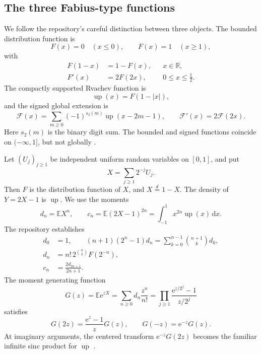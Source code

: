 \documentclass[11pt,oneside]{article}
\theoremstyle{definition}
\theoremstyle{remark}
\newcommand{\Fs}{\mathcal F}
\newcommand{\Up}{\operatorname{up}}
\newcommand{\E}{\mathbb E}
\newcommand{\R}{\mathbb R}
\newcommand{\dd}{\,\mathrm d}
\newcommand{\e}{\mathrm e}
\newcommand{\1}{\mathbf 1}
\begin{document}
\subsection{The three Fabius-type functions}
We follow the repository's careful distinction between three objects.  The
bounded distribution function is
\[
 F(x)=0\quad(x\leq0),\qquad F(x)=1\quad(x\geq1),
\]
with
\begin{align}
 F(1-x)&=1-F(x), &&x\in\R,                                      \label{p1:eq:F-reflect}\\
 F'(x)&=2F(2x), &&0\leq x\leq\tfrac12.                           \label{p1:eq:F-left-diff}
\end{align}
The compactly supported Rvachev function is
\begin{equation}
 \Up(x)=F(1-|x|),                                                \label{p1:eq:up-def}
\end{equation}
and the signed global extension is
\begin{equation}
 \Fs(x)=\sum_{m\geq0}(-1)^{s_2(m)}\Up(x-2m-1),
 \qquad \Fs'(x)=2\Fs(2x).                                      \label{p1:eq:signed-def}
\end{equation}
Here \(s_2(m)\) is the binary digit sum.  The bounded and signed functions
coincide on \(( -\infty,1]\), but not globally
\cite{p1:ProveItPrimary,p1:AriasArithmetic}.

Let \((U_j)_{j\geq1}\) be independent uniform random variables on \([0,1]\),
and put
\begin{equation}
 X=\sum_{j\geq1}2^{-j}U_j.                                      \label{p1:eq:X-def}
\end{equation}
Then \(F\) is the distribution function of \(X\), and \(X\overset d=1-X\).
The density of \(Y=2X-1\) is \(\Up\).  We use the moments
\begin{equation}
 d_n=\E X^n,
 \qquad
 c_n=\E(2X-1)^{2n}=\int_{-1}^1x^{2n}\Up(x)\dd x.                \label{p1:eq:dc-def}
\end{equation}
The repository establishes
\begin{align}
 d_0&=1,\qquad
 (n+1)(2^n-1)d_n=\sum_{k=0}^{n-1}\binom{n+1}{k}d_k,             \label{p1:eq:d-rec}\\
 d_n&=n!\,2^{\binom n2}F(2^{-n}),                               \label{p1:eq:d-dyadic}\\
 c_n&=\frac{2d_{2n+1}}{2n+1}.                                  \label{p1:eq:c-d}
\end{align}
The moment generating function
\begin{equation}
 G(z)=\E\e^{zX}=\sum_{n\geq0}d_n\frac{z^n}{n!}
 =\prod_{j\geq1}\frac{\e^{z/2^j}-1}{z/2^j}                    \label{p1:eq:G-product}
\end{equation}
satisfies
\begin{equation}
 G(2z)=\frac{\e^z-1}{z}G(z),\qquad G(-z)=\e^{-z}G(z).           \label{p1:eq:G-fe}
\end{equation}
At imaginary arguments, the centered transform
\(\e^{-z}G(2z)\) becomes the familiar infinite sinc product for \(\Up\)
\cite{p1:AriasCompact,p1:Rvachev1990,p1:ProveItPrimary}.
\end{document}
